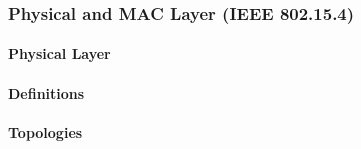 

\subsubsection{Physical and MAC Layer (IEEE 802.15.4)}

\paragraph{Physical Layer}


\paragraph{Definitions}

\paragraph{Topologies}

